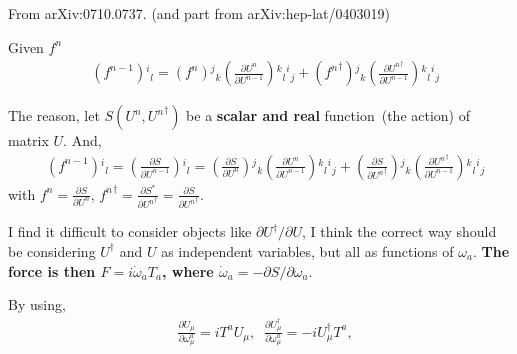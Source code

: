 \begin{tcolorbox}

From arXiv:0710.0737. (and part from arXiv:hep-lat/0403019)

Given $f^{n}$
\begin{equation}
\begin{split}
&\left(f^{n-1}\right) {}^i{}_l= \left(f^{n}\right){}^j{}_k\left(\frac{\partial U^{n}}{\partial U^{n-1}}\right){}^k{}_l{}^i{}_j + \left({f^{n}}^{\dagger}\right){}^j{}_k\left(\frac{\partial {U^{n}}^{\dagger}}{\partial U^{n-1}}\right){}^k{}_l{}^i{}_j
\end{split}
\end{equation}

The reason, let $S(U^n, {U^n}^{\dagger})$ be a \textbf{scalar and real} function~(the action) of matrix $U$. And,
\begin{equation}
\begin{split}
&\left(f^{n-1}\right) {}^i{}_l=\left(\frac{\partial S}{\partial U^{n-1}}\right){}^i{}_l= \left(\frac{\partial S}{\partial U^{n}}\right){}^j{}_k\left(\frac{\partial U^{n}}{\partial U^{n-1}}\right){}^k{}_l{}^i{}_j + \left(\frac{\partial S}{\partial {U^{n}}^{\dagger}}\right){}^j{}_k\left(\frac{\partial {U^{n}}^{\dagger}}{\partial U^{n-1}}\right){}^k{}_l{}^i{}_j
\end{split}
\end{equation}
with $f^{n}=\frac{\partial S}{\partial U^{n}}$, ${f^{n}}^{\dagger}=\frac{\partial S^*}{\partial {U^{n}}^{\dagger}}=\frac{\partial S}{\partial {U^{n}}^{\dagger}}$.

\end{tcolorbox}


I find it difficult to consider objects like $\partial U^{\dagger} / \partial U$, I think the correct way should be considering $U^{\dagger}$ and $U$ as independent variables, but all as functions of $\omega _a$. \textcolor[rgb]{0,0,1}{\textbf{The force is then $F=i\dot{\omega }_aT_a$, where $\dot{\omega}_a=-\partial S/\partial \omega _a$}}.

By using,
\begin{equation}
\begin{split}
&\frac{\partial U_{\mu}}{\partial \omega_{\mu}^a}=iT^aU_{\mu},\;\;\frac{\partial U^{\dagger}_{\mu}}{\partial \omega_{\mu}^a}=-iU^{\dagger}_{\mu}T^a,\\
\end{split}
\end{equation}

